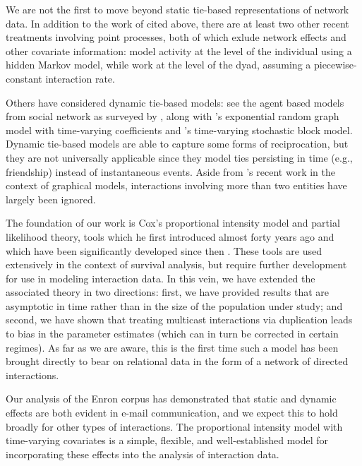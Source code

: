 \documentclass[final]{statsoc}
\begin{document}
We are not the first to move beyond static tie-based representations of
network data.  In addition to the work of \cite{butts2008relational} cited
above, there are at least two other recent treatments involving point
processes, both of which exlude network effects and other covariate
information: \citet{malmgen2009characterizing} model activity at the level of
the individual using a hidden Markov model, while \citet{heard2010bayesian} work
at the level of the dyad, assuming a piecewise-constant interaction rate.

Others have considered dynamic tie-based models: see the
agent based models from social network as surveyed by
\citet{snijders2010introduction}, along with
's \citeyearpar{hanneke2010discrete}
exponential random graph model with time-varying coefficients and
's \citeyearpar{kolar2010estimating}
time-varying stochastic block model.  Dynamic tie-based models are able
to capture some forms of reciprocation, but they are not universally
applicable since they model ties persisting in time (e.g., friendship)
instead of instantaneous events.
Aside from 's \citeyearpar{lunagomez2009geometric} recent
work in the context of graphical models, interactions involving more than two
entities have largely been ignored.

The foundation of our work is Cox's \citeyearpar{cox1972regression}
proportional intensity model and
partial likelihood theory, tools which he first introduced almost
forty years ago and which have been significantly developed since
then \citep{cox1975partial, fleming1991counting, andersen1993statistical, martinussen2006dynamic, cook2007statistical}.
These tools are used extensively in the context of survival analysis, but
require further development for use in modeling interaction data.
In this vein, we have extended the associated theory in
two directions: first, we have provided results that are asymptotic in time
rather than in the size of the population under study; and second, we
have shown that treating multicast interactions via duplication leads to
bias in the parameter estimates (which can in turn be corrected in
certain regimes).  As far as we are aware, this is the first time
such a model has been brought directly to bear on relational data in
the form of a network of directed interactions.

Our analysis of the Enron corpus has demonstrated that static and
dynamic effects are both evident in e-mail communication, and we expect this
to hold broadly for other types of interactions.  The proportional intensity
model with time-varying covariates is a simple, flexible, and
well-established model for incorporating these effects into the analysis
of interaction data.
\end{document}
